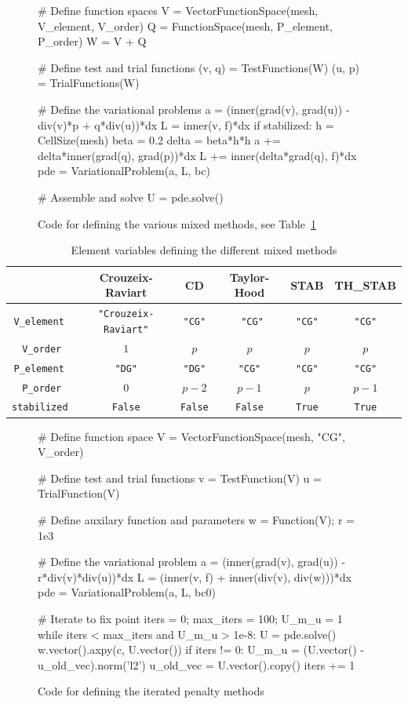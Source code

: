\begin{figure}
\small
\begin{python}
# Define function spaces
V = VectorFunctionSpace(mesh, V_element, V_order)
Q = FunctionSpace(mesh, P_element, P_order)
W = V + Q

# Define test and trial functions
(v, q) = TestFunctions(W)
(u, p) = TrialFunctions(W)

# Define the variational problems
a = (inner(grad(v), grad(u)) - div(v)*p + q*div(u))*dx
L = inner(v, f)*dx
if stabilized:
    h = CellSize(mesh)
    beta = 0.2
    delta = beta*h*h
    a += delta*inner(grad(q), grad(p))*dx
    L += inner(delta*grad(q), f)*dx
pde = VariationalProblem(a, L, bc)

# Assemble and solve
U = pde.solve()
\end{python}
\label{terrel:code:var:mixed}
\caption{Code for defining the various mixed methods, see
  Table~\ref{terrel:tab:element_vars}}
\end{figure}

\begin{table}
\centering
\caption{Element variables defining the different mixed methods}
\label{terrel:tab:element_vars}
\medskip
\small
\begin{tabular}{|cccccc|}
\hline
& Crouzeix-Raviart &  CD &  Taylor-Hood & STAB & TH\_STAB\\
\hline
{\tt V\_element } & {\tt "Crouzeix-Raviart"} &  {\tt "CG"} & {\tt
  "CG"} & {\tt "CG"} & {\tt "CG"}\\
{\tt V\_order} & $1$ & $p$ & $p$ & $p$ & $p$ \\
{\tt P\_element } & {\tt "DG"} &  {\tt "DG"} & {\tt "CG"} & {\tt "CG"} & {\tt "CG"}\\
{\tt P\_order} & $0$ & $p-2$ & $p-1$ & $p$ & $p-1$ \\
{\tt stabilized } & {\tt False} & {\tt False} &  {\tt False} & {\tt True} & {\tt True} \\
\hline
\end{tabular}
\end{table}


\begin{figure}
\small
\begin{python}
# Define function space
V = VectorFunctionSpace(mesh, "CG", V_order)

# Define test and trial functions
v = TestFunction(V)
u = TrialFunction(V)

# Define auxilary function and parameters
w = Function(V);  r = 1e3

# Define the variational problem
a = (inner(grad(v), grad(u)) - r*div(v)*div(u))*dx
L = (inner(v, f) + inner(div(v), div(w)))*dx
pde = VariationalProblem(a, L, bc0)

# Iterate to fix point
iters = 0; max_iters = 100; U_m_u = 1
while iters < max_iters and U_m_u > 1e-8:
    U = pde.solve()
    w.vector().axpy(c, U.vector())
    if iters != 0:
        U_m_u = (U.vector() - u_old_vec).norm('l2')
    u_old_vec = U.vector().copy()
    iters += 1
\end{python}
\label{terrel:code:var:ip}
\caption{Code for defining the iterated penalty methods}
\end{figure}

